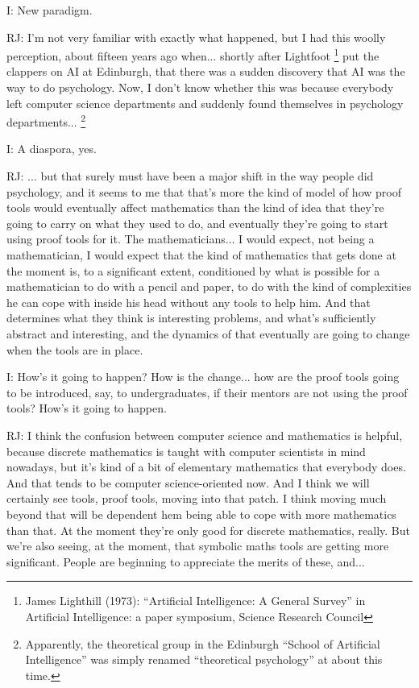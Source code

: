 \documentclass[10pt,titlepage]{book}
\begin{document}
I: New paradigm.

RJ: I'm not very familiar with exactly what happened, but I had this woolly perception, about fifteen years ago when... shortly after Lightfoot%
\footnote{
James Lighthill (1973): ``Artificial Intelligence: A General Survey'' in Artificial Intelligence: a paper symposium, Science Research Council }%
 put the clappers on AI at Edinburgh, that there was a sudden discovery that AI was the way to do psychology.
Now, I don't know whether this was because everybody left computer science departments and suddenly found themselves in psychology departments...%
\footnote{
Apparently, the theoretical group in the Edinburgh ``School of Artificial Intelligence'' was simply renamed ``theoretical psychology'' at about this time.}

I: A diaspora, yes.

RJ: ... but that surely must have been a major shift in the way people did psychology, and it seems to me that that's more the kind of model of how proof tools would eventually affect mathematics than the kind of idea that they're going to carry on what they used to do, and eventually they're going to start using proof tools for it.
The mathematicians... I would expect, not being a mathematician, I would expect that the kind of mathematics that gets done at the moment is, to a significant extent, conditioned by what is possible for a mathematician to do with a pencil and paper, to do with the kind of complexities he can cope with inside his head without any tools to help him.
And that determines what they think is interesting problems, and what's sufficiently abstract and interesting, and the dynamics of that eventually are going to change when the tools are in place.

I: How's it going to happen?
How is the change... how are the proof tools going to be introduced, say, to undergraduates, if their mentors are not using the proof tools?
How's it going to happen.

RJ: I think the confusion between computer science and mathematics is helpful, because discrete mathematics is taught with computer scientists in mind nowadays, but it's kind of a bit of elementary mathematics that everybody does. 
And that tends to be computer science-oriented now.
And I think we will certainly see tools, proof tools, moving into that patch.
I think moving much beyond that will be dependent hem being able to cope with more mathematics than that.
At the moment they're only good for discrete mathematics, really.
But we're also seeing, at the moment, that symbolic maths tools are getting more significant.
People are beginning to appreciate the merits of these, and...
\end{document}
